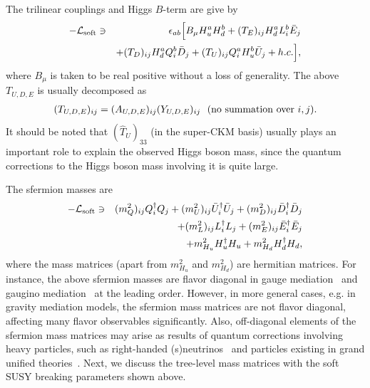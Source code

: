 \documentclass[preprint,3p,12pt]{elsarticle}
\begin{document}
The trilinear couplings and Higgs $B$-term are give by
\begin{eqnarray}
-\mathcal{L}_{\rm soft} &\ni& \epsilon_{ab} \Bigl[ B_\mu H_u^a H_d^b +  (T_E)_{ij} H_d^a L^b_i \bar E_j \nonumber \\
&&+  (T_D)_{ij} H_d^a Q^b_i \bar D_j +  (T_U)_{ij} Q^a_i H_u^b \bar U_j + h.c.
\Bigr], \label{eq:Lsoft_trilinear}
\end{eqnarray}
where $B_\mu$ is taken to be real positive without a loss of generality. 
The above $T_{U,D,E}$ is usually decomposed as 
\begin{eqnarray}
(T_{U, D, E})_{ij} = (A_{U, D, E})_{ij}  (Y_{U, D, E})_{ij} \ \ ({\rm no\,\, summation\,\, over} \,\, i, j).
\end{eqnarray}
It should be noted that $(\hat T_{U})_{33}$ (in the super-CKM basis) usually plays an important role to explain the observed Higgs boson mass, since the quantum corrections to the Higgs boson mass involving it is quite large. 

The sfermion masses are 
\begin{eqnarray}
-\mathcal{L}_{\rm soft} &\ni& 
(m_{Q}^2)_{ij} Q_i^\dag Q_j + (m_{U}^2)_{ij} \bar U_i^\dag \bar U_j + (m_{D}^2)_{ij} \bar D_i^\dag \bar D_j \nonumber \\
&&+ (m_{L}^2)_{ij} L_i^\dag L_j + (m_{E}^2)_{ij} \bar E_i^\dag \bar E_j  \nonumber \\
&&+ m_{H_u}^2 H_u^\dag H_u + m_{H_d}^2 H_d^\dag H_d 
, \label{eq:Lsoft_mass}
\end{eqnarray}
where the mass matrices (apart from $m_{H_u}^2$ and $m_{H_d}^2$) are hermitian matrices. For instance, the above sfermion masses are flavor diagonal in gauge mediation~\cite{Dine:1993yw,Dine:1994vc,Dine:1995ag} and gaugino mediation~\cite{Inoue:1991rk,Kaplan:1999ac,Chacko:1999mi} at the leading order. 
However, in more general cases, e.g. in gravity mediation models, 
the sfermion mass matrices are not flavor diagonal, affecting many flavor observables significantly. 
Also, off-diagonal elements of the sfermion mass matrices may arise as results of quantum corrections involving heavy particles, such as right-handed (s)neutrinos~\cite{Borzumati:1986qx, Hisano:1995nq, Hisano:1995cp} and  particles existing in grand unified theories~\cite{Barbieri:1995tw, Moroi:2000mr, Barenboim:2000ev,  Moroi:2000tk}.
%
Next, we discuss the tree-level mass matrices with the soft SUSY breaking parameters shown above. 
\end{document}
